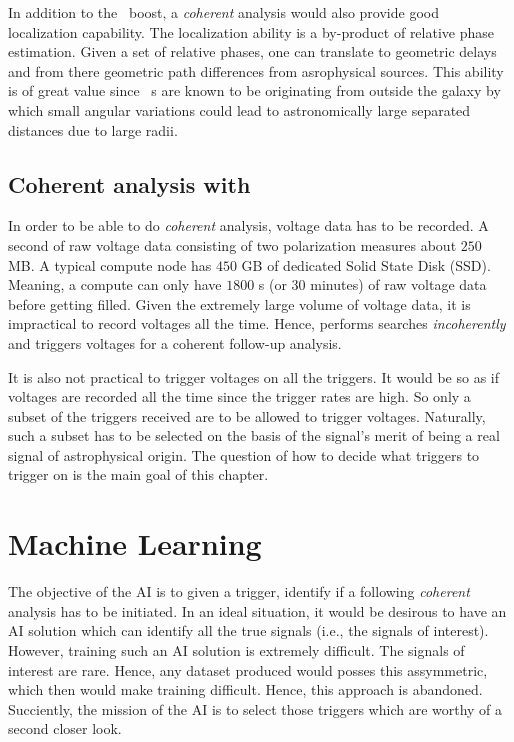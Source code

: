 \par In addition to the \sn~boost, a \emph{coherent} analysis would also provide good localization capability.
The localization ability is a by-product of relative phase estimation.
Given a set of relative phases, one can translate to geometric delays and from there geometric path differences from asrophysical sources.
This ability is of great value since \frb~s are known to be originating from outside the galaxy by which small angular variations could lead to astronomically large separated distances due to large radii.

\subsection{Coherent analysis with \vf}

\par In order to be able to do \emph{coherent} analysis, voltage data has to be recorded. 
A second of raw voltage data consisting of two polarization measures about $250$ MB. 
A typical \vf compute node has $450$ GB of dedicated Solid State Disk (SSD). Meaning, a \vf compute can only have $1800$ s (or $30$ minutes) of raw voltage data before getting filled.
Given the extremely large volume of voltage data, it is impractical to record voltages all the time.
Hence, \vf performs searches \emph{incoherently} and triggers voltages for a coherent follow-up analysis.

\par It is also not practical to trigger voltages on all the triggers. It would be so as if voltages are recorded all the time since the trigger rates are high.
So only a subset of the triggers received are to be allowed to trigger voltages. 
Naturally, such a subset has to be selected on the basis of the signal's merit of being a real signal of astrophysical origin.
The question of how to decide what triggers to trigger on is the main goal of this chapter.

\section {Machine Learning}
\label{sec:ml}

\par The objective of the AI is to given a trigger, identify if a following \emph{coherent} analysis has to be initiated.
In an ideal situation, it would be desirous to have an AI solution which can identify all the true signals (i.e., the signals of interest).
However, training such an AI solution is extremely difficult.
The signals of interest are rare. Hence, any dataset produced would posses this assymmetric, which then would make training difficult.
Hence, this approach is abandoned. 
Succiently, the mission of the AI is to select those triggers which are worthy of a second closer look.

